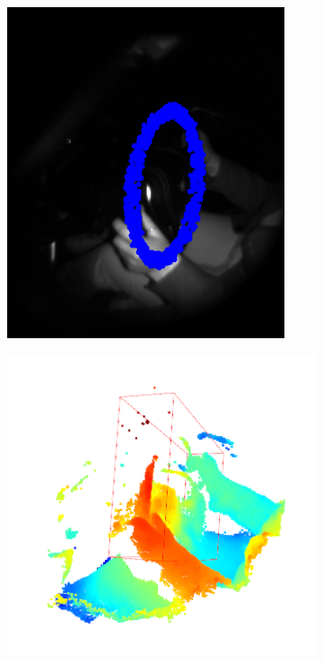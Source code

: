 \begin{figure}[ht]
\begin{subfigure}[t]{0.18\textwidth}
        \includegraphics[width=\textwidth]{media/chapter 4/sampled_points.png}
        \caption{}
        \label{fig:sampled_points}
    \end{subfigure}\hfill
    \begin{subfigure}[t]{0.18\textwidth}
        \centering
        \includegraphics[width=\textwidth]{media/chapter 4/obb.png}

\end{subfigure}
\end{figure}
